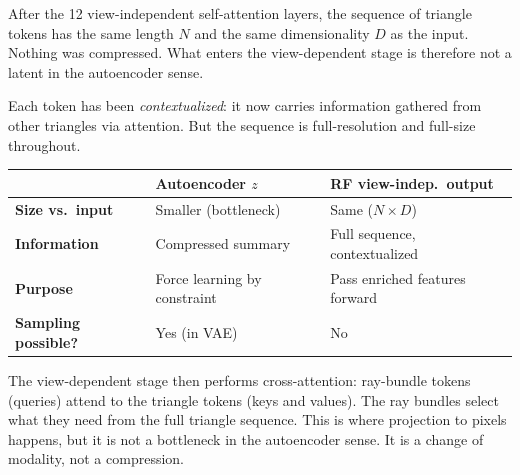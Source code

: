 \documentclass[12pt]{article}
\begin{document}
After the 12 view-independent self-attention layers, the sequence of triangle tokens has the same length $N$ and the same dimensionality $D$ as the input. Nothing was compressed. What enters the view-dependent stage is therefore not a latent in the autoencoder sense.

Each token has been \textit{contextualized}: it now carries information gathered from other triangles via attention. But the sequence is full-resolution and full-size throughout.

\begin{center}
\begin{tabular}{>{\bfseries}l p{4.5cm} p{4.5cm}}
\toprule
 & Autoencoder $z$ & RF view-indep.\ output \\
\midrule
Size vs.\ input & Smaller (bottleneck) & Same ($N \times D$) \\
Information & Compressed summary & Full sequence, contextualized \\
Purpose & Force learning by constraint & Pass enriched features forward \\
Sampling possible? & Yes (in VAE) & No \\
\bottomrule
\end{tabular}
\end{center}

The view-dependent stage then performs cross-attention: ray-bundle tokens (queries) attend to the triangle tokens (keys and values). The ray bundles select what they need from the full triangle sequence. This is where projection to pixels happens, but it is not a bottleneck in the autoencoder sense. It is a change of modality, not a compression.
\end{document}
